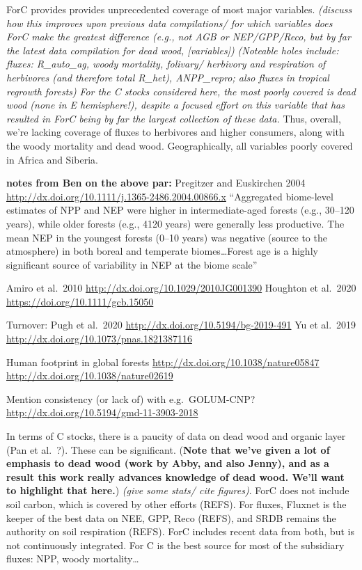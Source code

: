 \documentclass[
]{article}
\begin{document}
ForC provides provides unprecedented coverage of most major variables.
\emph{(discuss how this improves upon previous data compilations/ for
which variables does ForC make the greatest difference (e.g., not AGB or
NEP/GPP/Reco, but by far the latest data compilation for dead wood,
{[}variables{]})} \emph{(Noteable holes include: fluxes: R\_auto\_ag,
woody mortality, folivary/ herbivory and respiration of herbivores (and
therefore total R\_het), ANPP\_repro; also fluxes in tropical regrowth
forests)} \emph{For the C stocks considered here, the most poorly
covered is dead wood (none in E hemisphere!), despite a focused effort
on this variable that has resulted in ForC being by far the largest
collection of these data.} Thus, overall, we're lacking coverage of
fluxes to herbivores and higher consumers, along with the woody
mortality and dead wood. Geographically, all variables poorly covered in
Africa and Siberia.

\textbf{notes from Ben on the above par:} Pregitzer and Euskirchen 2004
\url{http://dx.doi.org/10.1111/j.1365-2486.2004.00866.x} ``Aggregated
biome-level estimates of NPP and NEP were higher in intermediate-aged
forests (e.g., 30--120 years), while older forests (e.g., 4120 years)
were generally less productive. The mean NEP in the youngest forests
(0--10 years) was negative (source to the atmosphere) in both boreal and
temperate biomes\ldots Forest age is a highly significant source of
variability in NEP at the biome scale''

Amiro et al.~2010 \url{http://dx.doi.org/10.1029/2010JG001390} Houghton
et al.~2020 \url{https://doi.org/10.1111/gcb.15050}

Turnover: Pugh et al.~2020 \url{http://dx.doi.org/10.5194/bg-2019-491}
Yu et al.~2019 \url{http://dx.doi.org/10.1073/pnas.1821387116}

Human footprint in global forests
\url{http://dx.doi.org/10.1038/nature05847}
\url{http://dx.doi.org/10.1038/nature02619}

Mention consistency (or lack of) with e.g.~GOLUM-CNP?
\url{http://dx.doi.org/10.5194/gmd-11-3903-2018}

In terms of C stocks, there is a paucity of data on dead wood and
organic layer (Pan et al.~?). These can be significant. (\textbf{Note
that we've given a lot of emphasis to dead wood (work by Abby, and also
Jenny), and as a result this work really advances knowledge of dead
wood. We'll want to highlight that here.}) \emph{(give some stats/ cite
figures)}. ForC does not include soil carbon, which is covered by other
efforts (REFS). For fluxes, Fluxnet is the keeper of the best data on
NEE, GPP, Reco (REFS), and SRDB remains the authority on soil
respiration (REFS). ForC includes recent data from both, but is not
continuously integrated. For C is the best source for most of the
subsidiary fluxes: NPP, woody mortality\ldots{}
\end{document}

